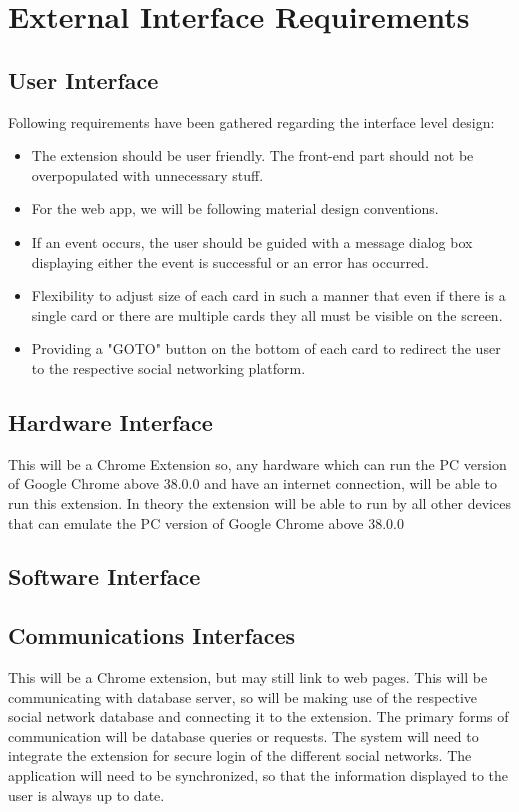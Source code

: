 \documentclass[12pt]{article}
\begin{document}
\section{External Interface Requirements}
\subsection{User Interface}
Following requirements have been gathered regarding the
interface level design:

\begin{itemize}
    \item The extension should be user friendly. The front-end
part should not be overpopulated with unnecessary
stuff.
    \item For the web app, we will be following material design
conventions.
    \item If an event occurs, the user should be guided with a
message dialog box displaying either the event is successful or an error has occurred.
    \item Flexibility to adjust size of each card in such a
manner that even if there is a single card or there
are multiple cards they all must be visible on the
screen.
    \item Providing a {"}GOTO{"} button on the bottom of each card to redirect
the user to the respective social networking platform. 
\end{itemize}

\subsection{Hardware Interface}
This will be a Chrome Extension so, any hardware which
can run the PC version of Google Chrome above 38.0.0 and
have an internet connection, will be able to run this
extension. In theory the extension will be able to run by all
other devices that can emulate the PC version of Google
Chrome above 38.0.0

\subsection{Software Interface}

\subsection{ Communications Interfaces}
This will be a Chrome extension, but may still link to web
pages. This will be communicating with database server, so
will be making use of the respective social network
database and connecting it to the extension. The primary
forms of communication will be database queries or
requests. The system will need to integrate the extension
for secure login of the different social networks. The
application will need to be synchronized, so that the
information displayed to the user is always up to date.
\end{document}
